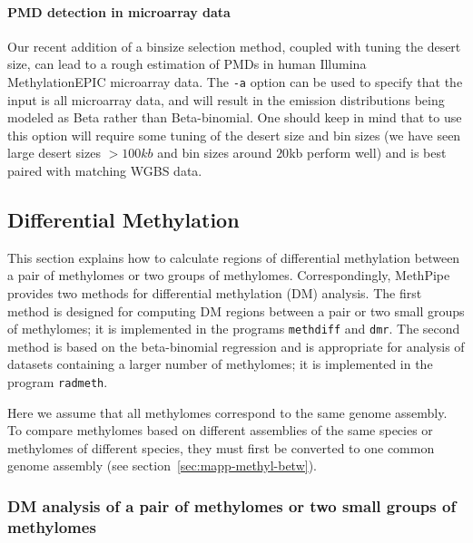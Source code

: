\documentclass[10pt]{article}
\newcommand{\prog}[1]{\texttt{#1}}
\newcommand{\op}[1]{\texttt{#1}}
\begin{document}
\paragraph{PMD detection in microarray data}

Our recent addition of a binsize selection method, coupled with tuning
the desert size, can lead to a rough estimation of PMDs in human
Illumina MethylationEPIC microarray data. The \op{-a} option can be
used to specify that the input is all microarray data, and will result
in the emission distributions being modeled as Beta rather than
Beta-binomial. One should keep in mind that to use this option will
require some tuning of the desert size and bin sizes (we have seen
large desert sizes $>100kb$ and bin sizes around $20$kb perform well)
and is best paired with matching WGBS data.

\subsection{Differential Methylation}
\label{sec:differential_methylation}

This section explains how to calculate regions of differential methylation
between a pair of methylomes or two groups of methylomes. Correspondingly,
MethPipe provides two methods for differential methylation (DM) analysis.
The first method is designed for computing DM regions between a pair or two
small groups of methylomes; it is implemented in the programs \prog{methdiff}
and \prog{dmr}. The second method is based on the beta-binomial
regression and is appropriate for analysis of datasets containing a larger
number of methylomes; it is implemented in the program \prog{radmeth}.

Here we assume that all methylomes correspond to the same genome
assembly. To compare methylomes based on different assemblies of the
same species or methylomes of different species, they must first be
converted to one common genome assembly (see
section~\ref{sec:mapp-methyl-betw}).

\subsubsection{DM analysis of a pair of methylomes or two small groups of
                           methylomes}
\end{document}
